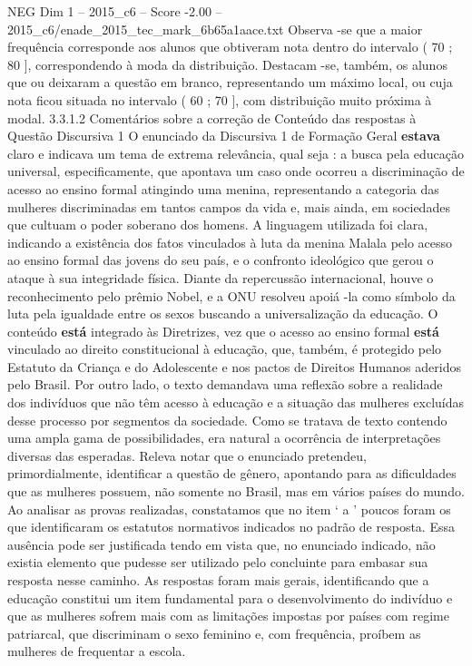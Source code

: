 \begin{textsample}{NEG Dim 1 – 2015\_c6 – Score -2.00 – 2015\_c6/enade\_2015\_tec\_mark\_6b65a1aace.txt}
Observa -se que a maior frequência corresponde aos alunos que obtiveram nota dentro do intervalo ( 70 ; 80 ], correspondendo à moda da distribuição.
Destacam -se, também, os alunos que ou deixaram a questão em branco, representando um máximo local, ou cuja nota ficou situada no intervalo ( 60 ; 70 ], com distribuição muito próxima à modal. 3.3.1.2 Comentários sobre a correção de Conteúdo das respostas à Questão Discursiva 1 O enunciado da Discursiva 1 de Formação Geral \textbf{estava} claro e indicava um tema de extrema relevância, qual seja : a busca pela educação universal, especificamente, que apontava um caso onde ocorreu a discriminação de acesso ao ensino formal atingindo uma menina, representando a categoria das mulheres discriminadas em tantos campos da vida e, mais ainda, em sociedades que cultuam o poder soberano dos homens.
A linguagem utilizada foi clara, indicando a existência dos fatos vinculados à luta da menina Malala pelo acesso ao ensino formal das jovens do seu país, e o confronto ideológico que gerou o ataque à sua integridade física.
Diante da repercussão internacional, houve o reconhecimento pelo prêmio Nobel, e a ONU resolveu apoiá -la como símbolo da luta pela igualdade entre os sexos buscando a universalização da educação.
O conteúdo \textbf{está} integrado às Diretrizes, vez que o acesso ao ensino formal \textbf{está} vinculado ao direito constitucional à educação, que, também, é protegido pelo Estatuto da Criança e do Adolescente e nos pactos de Direitos Humanos aderidos pelo Brasil.
Por outro lado, o texto demandava uma reflexão sobre a realidade dos indivíduos que não têm acesso à educação e a situação das mulheres excluídas desse processo por segmentos da sociedade.
Como se tratava de texto contendo uma ampla gama de possibilidades, era natural a ocorrência de interpretações diversas das esperadas.
Releva notar que o enunciado pretendeu, primordialmente, identificar a questão de gênero, apontando para as dificuldades que as mulheres possuem, não somente no Brasil, mas em vários países do mundo.
Ao analisar as provas realizadas, constatamos que no item ‘ a ’ poucos foram os que identificaram os estatutos normativos indicados no padrão de resposta.
Essa ausência pode ser justificada tendo em vista que, no enunciado indicado, não existia elemento que pudesse ser utilizado pelo concluinte para embasar sua resposta nesse caminho.
As respostas foram mais gerais, identificando que a educação constitui um item fundamental para o desenvolvimento do indivíduo e que as mulheres sofrem mais com as limitações impostas por países com regime patriarcal, que discriminam o sexo feminino e, com frequência, proíbem as mulheres de frequentar a escola.

\end{textsample}
